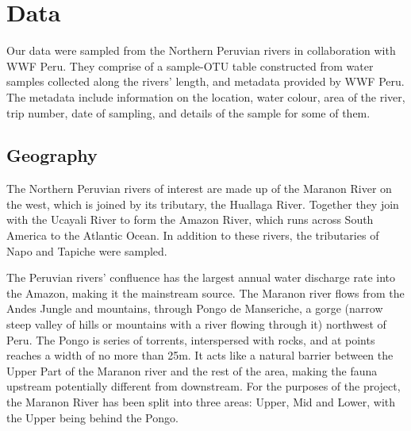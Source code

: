 %



\section{Data}
Our data were sampled from the Northern Peruvian rivers in collaboration with WWF Peru. They comprise of a sample-OTU table constructed from water samples collected along the rivers' length, and metadata provided by WWF Peru. The metadata include information on the location, water colour, area of the river, trip number, date of sampling, and details of the sample for some of them.
\subsection{Geography}
The Northern Peruvian rivers of interest are made up of the Maranon River on the west, which is joined by its tributary, the Huallaga River. Together they join with the Ucayali River to form the Amazon River, which runs across South America to the Atlantic Ocean. In addition to these rivers, the tributaries of Napo and Tapiche were sampled. 

The Peruvian rivers' confluence has the largest annual water discharge rate into the Amazon, making it the mainstream  source. The Maranon river flows from the Andes Jungle and mountains, through Pongo de Manseriche, a gorge (narrow steep valley of hills or mountains with a river flowing through it) northwest of Peru. The Pongo is series of torrents, interspersed with rocks, and at points reaches a width of no more than 25m. It acts like a natural barrier between the Upper Part of the Maranon river and the rest of the area, making the fauna upstream potentially different from downstream. For the purposes of the project, the Maranon River has been split into three areas: Upper, Mid and Lower, with the Upper being behind the Pongo. 

